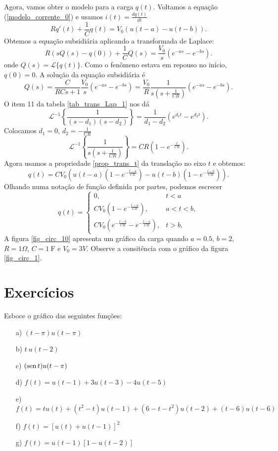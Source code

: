 Agora, vamos obter o modelo para a carga $q(t)$. Voltamos a equação (\ref{modelo_corrente_0}) e usamos $i(t)=\frac{dq(t)}{dt}$
$$
 Rq'(t)+\frac{1}{C}q(t)=V_0\left(u(t-a)-u(t-b)\right).
$$
Obtemos a equação subsidiária aplicando a transformada de Laplace:
\begin{equation*}
  R\left(sQ(s)-q(0)\right)+\frac{1}{C}Q(s)=\frac{V_0}{s}\left(e^{-as}-e^{-bs}\right).
\end{equation*}
onde $Q(s)=\mathcal{L}\{q(t)\}$. Como o fenômeno estava em repouso no início, $q(0)=0$. A solução da equação subsidiária é
$$
Q(s)=\frac{C}{RCs+1}\frac{V_0}{s}\left(e^{-as}-e^{-bs}\right)=\frac{V_0}{R}\frac{1}{s\left(s+\frac{1}{CR}\right)}\left(e^{-as}-e^{-bs}\right).
$$
O item 11 da tabela \ref{tab_trans_Lap_1} nos dá 
$$
\mathcal{L}^{-1}\left\{\frac{1}{(s-d_1)(s-d_2)}\right\}=\frac{1}{d_1-d_2}\left(e^{d_1t}-e^{d_2t}\right).
$$
Colocamos $d_1=0$, $d_2=-\frac{1}{CR}$ 
$$
\mathcal{L}^{-1}\left\{\frac{1}{s\left(s+\frac{1}{CR}\right)}\right\}=CR\left(1-e^{-\frac{t}{CR}}\right).
$$
Agora usamos a propriedade \ref{prop_trans_t} da translação no eixo $t$ e obtemos:
$$
q(t)=CV_0\left(u(t-a)\left(1-e^{-\frac{t-a}{CR}}\right)-u(t-b)\left(1-e^{-\frac{t-b}{CR}}\right) \right).
$$
Olhando numa notação de função definida por partes, podemos escrecer
$$
q(t)=\left\{\begin{array}{ll}0,&t<a  \\ CV_0\left(1-e^{-\frac{t-a}{CR}}\right), &a<t<b, \\ CV_0\left(e^{-\frac{t-b}{CR}}-e^{-\frac{t-a}{CR}} \right), &t>b, \end{array}\right.
$$
A figura \ref{fig_circ_10} apresenta um gráfico da carga quando $a=0.5$, $b=2$, $R=1\Omega$, $C=1\ \!$F e $V_0=3V$. Observe a consitência com o gráfico da figura \ref{fig_circ_1}.

\section{Exercícios}
\begin{Exercise}{\label{ex_Heaviside0}}Esboce o gráfico das seguintes funções:
\begin{itemize}
 \item [a)] $\displaystyle (t-\pi)u(t-\pi)$
 \item [b)] $\displaystyle t \ u(t-2)$
 \item [c)] $\displaystyle (\operatorname{sen} t) u(t-\pi)$
 \item [d)] $f(t)=u(t-1)+3u(t-3)-4u(t-5)$ 
 \item [e)] $f(t)=tu(t)+(t^2-t)u(t-1)+(6-t-t^2)u(t-2)+(t-6)u(t-6)$
 \item [f)] $f(t)=\left[u(t)+u(t-1)\right]^2$
 \item [g)] $f(t)=u(t-1)\left[1-u(t-2)\right] $
\end{itemize}

\end{Exercise}

